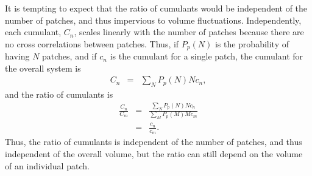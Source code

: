 \documentclass[aps,prc,nofootinbib,showpacs,superscriptaddress,groupedaddress]{revtex4-1}
\begin{document}
It is tempting to expect that the ratio of cumulants would be independent of the number of patches, and thus impervious to volume fluctuations. Independently, each cumulant, $C_n$, scales linearly with the number of patches because there are no cross correlations between patches. Thus,
if $P_p(N)$ is the probability of having $N$ patches, and if $c_n$ is the cumulant for a single patch, the cumulant for the overall system is
\begin{eqnarray}
\label{eq:patchprob}
C_n&=&\sum_NP_p(N) Nc_n,
\end{eqnarray}
and the ratio of cumulants is 
\begin{eqnarray}
\frac{C_n}{C_m}&=&\frac{\sum_NP_p(N)Nc_n}{\sum_MP_p(M)Mc_m}\\
\nonumber
&=&\frac{c_n}{c_m}.
\end{eqnarray}
Thus, the ratio of cumulants is independent of the number of patches, and thus independent of the overall volume, but the ratio can still depend on the volume of an individual patch.
\end{document}
